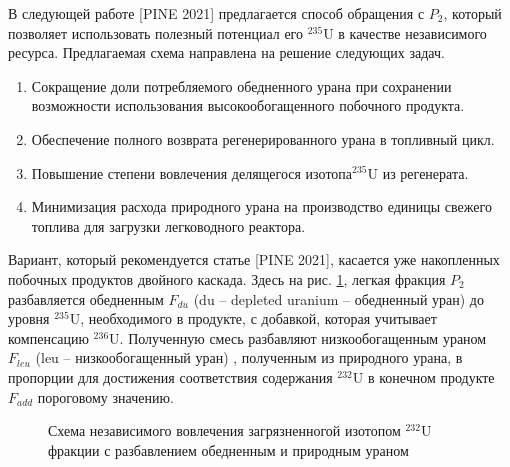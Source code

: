 В следующей работе [PINE 2021] предлагается способ обращения с $P_2$, который позволяет использовать полезный потенциал его $^{235}$U в качестве независимого ресурса. Предлагаемая схема направлена на решение следующих задач.

\begin{enumerate}
  \item Сокращение доли потребляемого обедненного урана при сохранении возможности использования высокообогащенного побочного продукта.
  \item Обеспечение полного возврата регенерированного урана в топливный цикл.
  \item Повышение степени вовлечения делящегося изотопа$^{235}$U из регенерата.
  \item Минимизация расхода природного урана на производство единицы свежего топлива для загрузки легководного реактора.
\end{enumerate}

Вариант, который рекомендуется статье [PINE 2021], касается уже накопленных побочных продуктов двойного каскада. Здесь на рис. \ref{P2utilization}, легкая фракция $P_2$  разбавляется обедненным  $F_{du}$ (du -- depleted uranium -- обедненный уран) до уровня $^{235}$U, необходимого в продукте, с добавкой, которая учитывает компенсацию $^{236}$U. Полученную смесь разбавляют низкообогащенным ураном  $F_{leu}$ (leu -- низкообогащенный уран) , полученным из природного урана, в пропорции для достижения соответствия содержания $^{232}$U в конечном продукте $F_{add}$ пороговому значению.

\begin{figure}[ht]
  \caption{Схема независимого вовлечения загрязненногой изотопом $^{232}$U фракции с разбавлением обедненным и природным ураном}\label{P2utilization}
\end{figure}



